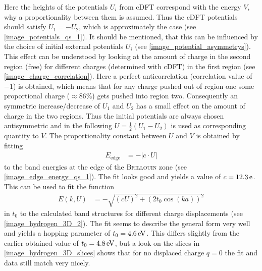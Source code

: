 Here the heights of the potentials $U_i$ from cDFT correspond with the energy $V$, why a proportionality between them is assumed. Thus the cDFT potentials should satisfy $U_1 = - U_2$, which is approximately the case (see \cref{image_potentials_qs_1}). It should be mentioned, that this can be influenced by the choice of initial external potentials $U_i$ (see \cref{image_potential_asymmetrys}). This effect can be understood by looking at the amount of charge in the second region (free) for different charges (determined with cDFT) in the first region (see \cref{image_charge_correlation}). Here a perfect anticorrelation (correlation value of $-1$) is obtained, which means that for any charge pushed out of region one some proportional charge ($\approx 86\%$) gets pushed into region two. Consequently an symmetric increase/decrease of $U_1$ and $U_2$ has a small effect on the amount of charge in the two regions. Thus the initial potentials are always chosen antisymmetric and in the following $U = \frac{1}{2}(U_1 - U_2)$ is used as corresponding quantity to $V$. The proportionality constant between $U$ and $V$ is obtained by fitting
\begin{align}
	E_\text{edge} &= -\left|c \cdot U\right|
\end{align}
to the band energies at the edge of the \textsc{Brillouin} zone (see \cref{image_edge_energy_qs_1}). The fit looks good and yields a value of $c = \unit[12.3]{e}$.\\
This can be used to fit the function
\begin{align}
	E\left(k, U\right) &= - \sqrt{\left(cU\right)^2 + \left(2t_0\cos(ka)\right)^2}
\end{align}
in $t_0$ to the calculated band structures for different charge displacements (see \cref{image_hydrogen_3D_2}). The fit seems to describe the general form very well and yields a hopping parameter of $t_0 = \unit[4.6]{eV}$. This differs slightly from the earlier obtained value of $t_0 = \unit[4.8]{eV}$, but a look on the slices in \cref{image_hydrogen_3D_slices} shows that for no displaced charge $q = 0$ the fit and data still match very nicely.\\
